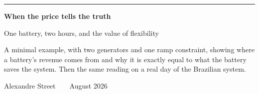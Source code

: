{
\begin{frame}[plain]
  \vspace{1.7em}
  {\color{brick}\rule{3.6em}{2.4pt}}

  \vspace{1.1em}
  {\fontsize{29}{33}\selectfont\bfseries When the price tells the truth\par}

  \vspace{0.55em}
  {\fontsize{14.5}{18}\selectfont\color{muted} One battery, two hours, and the value of flexibility\par}

  \vspace{1.5em}
  \begin{minipage}{0.70\textwidth}
    \fontsize{9.6}{13}\selectfont
    A minimal example, with two generators and one ramp constraint, showing where
    a battery's revenue comes from and why it is exactly equal to what the battery
    saves the system. Then the same reading on a real day of the Brazilian system.
  \end{minipage}

  \vfill
  {\fontsize{8.4}{10}\selectfont\color{muted} Alexandre Street\ \ \textbullet\ \ August 2026}
  \vspace{0.8em}
\end{frame}}

